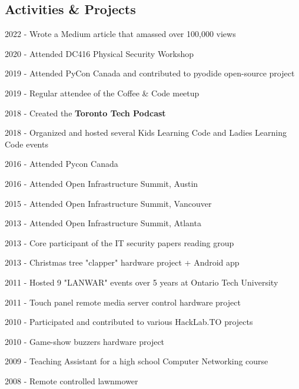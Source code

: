 \documentclass[margin,line]{resume}
\begin{document}
\begin{resume}
\sectionline
    \section{\mysidestyle \textbf{\large{A}\small{ctivities \& Projects}}}

    \begin{list2}
        \item 2022 - Wrote a Medium article that amassed over 100,000 views
        \item 2020 - Attended DC416 Physical Security Workshop
        \item 2019 - Attended PyCon Canada and contributed to pyodide open-source project
        \item 2019 - Regular attendee of the Coffee \& Code meetup
        \item 2018 - Created the \textbf{Toronto Tech Podcast}
        \item 2018 - Organized and hosted several Kids Learning Code and Ladies Learning Code events
        \item 2016 - Attended Pycon Canada
        \item 2016 - Attended Open Infrastructure Summit, Austin
        \item 2015 - Attended Open Infrastructure Summit, Vancouver
        \item 2013 - Attended Open Infrastructure Summit, Atlanta
        \item 2013 - Core participant of the IT security papers reading group
        \item 2013 - Christmas tree "clapper" hardware project + Android app
        \item 2011 - Hosted 9 "LANWAR" events over 5 years at Ontario Tech University
        \item 2011 - Touch panel remote media server control hardware project
        \item 2010 - Participated and contributed to various HackLab.TO projects
        \item 2010 - Game-show buzzers hardware project
        \item 2009 - Teaching Assistant for a high school Computer Networking course
        \item 2008 - Remote controlled lawnmower
    \end{list2}\vspace{-1.5mm}


\end{resume}
\end{document}
